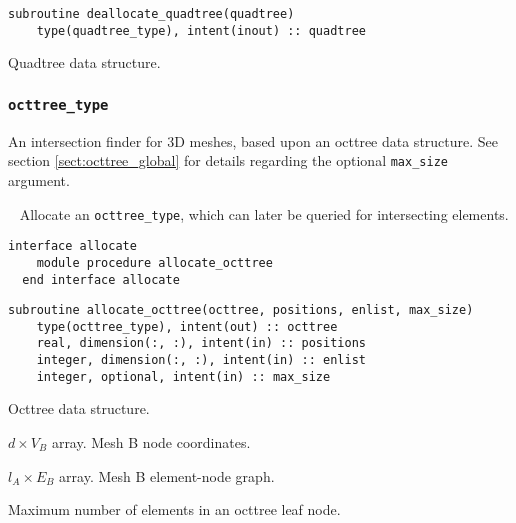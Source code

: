 \documentclass{article}
\begin{document}
\begin{lstlisting}[language=FORTRAN]
  subroutine deallocate_quadtree(quadtree)
    type(quadtree_type), intent(inout) :: quadtree
\end{lstlisting}

\begin{description}[font=\ttfamily\bfseries,leftmargin=2.2\parindent,labelindent=1.7\parindent,noitemsep]
  \item[quadtree] Quadtree data structure.
\end{description}

\subsubsection{\texttt{octtree\_type}}\label{sect:octtree_query}
  
An intersection finder for 3D meshes, based upon an octtree data structure. See
section \ref{sect:octtree_global} for details regarding the optional
\verb+max_size+ argument.

~\newline
Allocate an \verb+octtree_type+, which can later be queried for intersecting
elements.

\begin{lstlisting}[language=FORTRAN]
  interface allocate
    module procedure allocate_octtree
  end interface allocate
\end{lstlisting}
  
\begin{lstlisting}[language=FORTRAN]
  subroutine allocate_octtree(octtree, positions, enlist, max_size)
    type(octtree_type), intent(out) :: octtree
    real, dimension(:, :), intent(in) :: positions
    integer, dimension(:, :), intent(in) :: enlist
    integer, optional, intent(in) :: max_size 
\end{lstlisting}

\begin{description}[font=\ttfamily\bfseries,leftmargin=2.2\parindent,labelindent=1.7\parindent,noitemsep]
  \item[octtree] Octtree data structure.
  \item[positions] $d \times V_B$ array. Mesh B node coordinates.
  \item[enlist] $l_A \times E_B$ array. Mesh B element-node graph.
  \item[max\_size] Maximum number of elements in an octtree leaf node.
\end{description}
\end{document}
